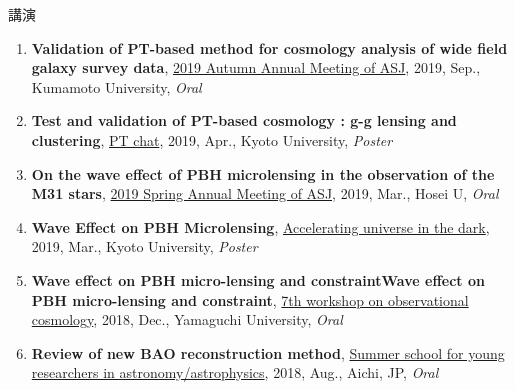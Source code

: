 \begin{rSection}{講演}
\begin{enumerate}[itemsep=0pt, parsep=0pt, topsep=0pt, partopsep=0pt]
\item \textbf{Validation of PT-based method for cosmology analysis of wide field galaxy survey data}, \href{https://www.asj.or.jp/nenkai/archive/2019b/pdf/U20a.pdf}{2019 Autumn Annual Meeting of ASJ}, 2019, Sep., Kumamoto University, \textit{Oral}
\item \textbf{Test and validation of PT-based cosmology : g-g lensing and clustering}, \href{http://pt-chat-kyoto.sciencesconf.org/}{PT chat}, 2019, Apr., Kyoto University, \textit{Poster}
\item \textbf{On the wave effect of PBH microlensing in the observation of the M31 stars}, \href{https://www.asj.or.jp/nenkai/archive/2019a/pdf/U14a.pdf}{2019 Spring Annual Meeting of ASJ}, 2019, Mar., Hosei U, \textit{Oral}
\item \textbf{Wave Effect on PBH Microlensing}, \href{http://www2.yukawa.kyoto-u.ac.jp/~aud2019/index.php}{Accelerating universe in the dark}, 2019, Mar., Kyoto University, \textit{Poster}
\item \textbf{Wave effect on PBH micro-lensing and constraintWave effect on PBH micro-lensing and constraint}, \href{http://web.cc.yamaguchi-u.ac.jp/~rsaito/obscosmo2018/}{7th workshop on observational cosmology}, 2018, Dec., Yamaguchi University, \textit{Oral}
\item \textbf{Review of new BAO reconstruction method}, \href{http://www.astro-wakate.org/ss2018/web/link.html}{Summer school for young researchers in astronomy/astrophysics}, 2018, Aug., Aichi, JP, \textit{Oral}
\end{enumerate}\end{rSection}
